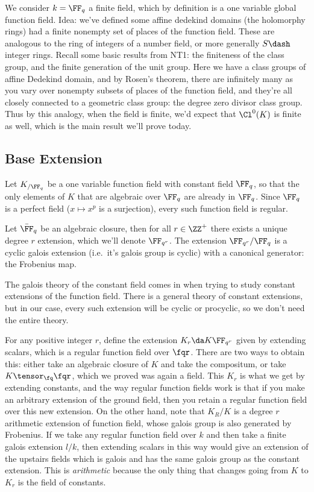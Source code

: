 We consider \(k= \FF_q\) a finite field, which by definition is a one
variable global function field. Idea: we've defined some affine dedekind
domains (the holomorphy rings) had a finite nonempty set of places of
the function field. These are analogous to the ring of integers of a
number field, or more generally \(S\dash\)integer rings. Recall some
basic results from NT1: the finiteness of the class group, and the
finite generation of the unit group. Here we have a class groups of
affine Dedekind domain, and by Rosen's theorem, there are infinitely
many as you vary over nonempty subsets of places of the function field,
and they're all closely connected to a geometric class group: the degree
zero divisor class group. Thus by this analogy, when the field is
finite, we'd expect that \(\Cl^0(K)\) is finite as well, which is the
main result we'll prove today.

\hypertarget{base-extension-1}{%
\subsection{Base Extension}\label{base-extension-1}}

Let \(K_{/\FF_q}\) be a one variable function field with constant field
\(\FF_q\), so that the only elements of \(K\) that are algebraic over
\(\FF_q\) are already in \(\FF_q\). Since \(\FF_q\) is a perfect field
(\(x\mapsto x^p\) is a surjection), every such function field is
regular.

Let \(\bar{\FF}_q\) be an algebraic closure, then for all \(r\in \ZZ^+\)
there exists a unique degree \(r\) extension, which we'll denote
\(\FF_{q^r}\). The extension \(\FF_{q^r}/\FF_q\) is a cyclic galois
extension (i.e.~it's galois group is cyclic) with a canonical generator:
the Frobenius map.

The galois theory of the constant field comes in when trying to study
constant extensions of the function field. There is a general theory of
constant extensions, but in our case, every such extension will be
cyclic or procyclic, so we don't need the entire theory.

For any positive integer \(r\), define the extension
\(K_r \da K \FF_{q^r}\) given by extending scalars, which is a regular
function field over \(\fqr\). There are two ways to obtain this: either
take an algebraic closure of \(K\) and take the compositum, or take
\(K\tensor_{\fq}\fqr\), which we proved was again a field. This \(K_r\)
is what we get by extending constants, and the way regular function
fields work is that if you make an arbitrary extension of the ground
field, then you retain a regular function field over this new extension.
On the other hand, note that \(K_R/K\) is a degree \(r\) arithmetic
extension of function field, whose galois group is also generated by
Frobenius. If we take any regular function field over \(k\) and then
take a finite galois extension \(l/k\), then extending scalars in this
way would give an extension of the upstairs fields which is galois and
has the same galois group as the constant extension. This is
\emph{arithmetic} because the only thing that changes going from \(K\)
to \(K_r\) is the field of constants.

